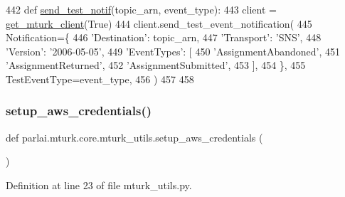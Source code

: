 \begin{DoxyCode}
442 \textcolor{keyword}{def }\hyperlink{namespaceparlai_1_1mturk_1_1core_1_1mturk__utils_a03b8f25675cb76e8b27205ca5d26e623}{send\_test\_notif}(topic\_arn, event\_type):
443     client = \hyperlink{namespaceparlai_1_1mturk_1_1core_1_1mturk__utils_a577e2527c04682284394b0951a090695}{get\_mturk\_client}(\textcolor{keyword}{True})
444     client.send\_test\_event\_notification(
445         Notification=\{
446             \textcolor{stringliteral}{'Destination'}: topic\_arn,
447             \textcolor{stringliteral}{'Transport'}: \textcolor{stringliteral}{'SNS'},
448             \textcolor{stringliteral}{'Version'}: \textcolor{stringliteral}{'2006-05-05'},
449             \textcolor{stringliteral}{'EventTypes'}: [
450                 \textcolor{stringliteral}{'AssignmentAbandoned'},
451                 \textcolor{stringliteral}{'AssignmentReturned'},
452                 \textcolor{stringliteral}{'AssignmentSubmitted'},
453             ],
454         \},
455         TestEventType=event\_type,
456     )
457 
458 
\end{DoxyCode}
\mbox{\label{namespaceparlai_1_1mturk_1_1core_1_1mturk__utils_a018a49fdf2cf6ff4c0b279d2f5b1bff0}} 
\subsubsection{\texorpdfstring{setup\+\_\+aws\+\_\+credentials()}{setup\_aws\_credentials()}}
{\footnotesize\ttfamily def parlai.\+mturk.\+core.\+mturk\+\_\+utils.\+setup\+\_\+aws\+\_\+credentials (\begin{DoxyParamCaption}{ }\end{DoxyParamCaption})}



Definition at line 23 of file mturk\+\_\+utils.\+py.


